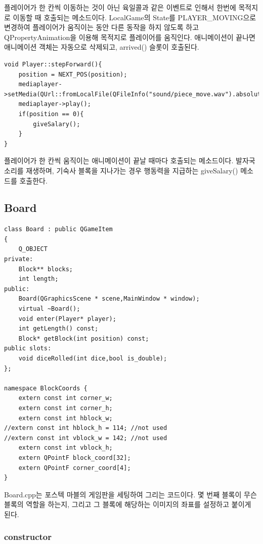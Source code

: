 \documentclass[10pt,oneside,a4paper,titlepage]{article}
\begin{document}
플레이어가 한 칸씩 이동하는 것이 아닌 육일콜과 같은 이벤트로 인해서 한번에 목적지로 이동할 때 호출되는 메소드이다. LocalGame의 State를 PLAYER\_MOVING으로 변경하여 플레이어가 움직이는 동안 다른 동작을 하지 않도록 하고 QPropertyAnimation을 이용해 목적지로 플레이어를 움직인다. 애니메이션이 끝나면 애니메이션 객체는 자동으로 삭제되고, arrived() 슬롯이 호출된다.\\

\begin{lstlisting}
void Player::stepForward(){
    position = NEXT_POS(position);
    mediaplayer->setMedia(QUrl::fromLocalFile(QFileInfo("sound/piece_move.wav").absoluteFilePath()));
    mediaplayer->play();
    if(position == 0){
        giveSalary();
    }
}
\end{lstlisting}
플레이어가 한 칸씩 움직이는 애니메이션이 끝날 때마다 호출되는 메소드이다. 발자국 소리를 재생하며, 기숙사 블록을 지나가는 경우 행동력을 지급하는 giveSalary() 메소드를 호출한다.\\


\subsection{Board}


\begin{lstlisting}
class Board : public QGameItem
{
    Q_OBJECT
private:
    Block** blocks;
    int length;
public:
    Board(QGraphicsScene * scene,MainWindow * window);
    virtual ~Board();
    void enter(Player* player);
    int getLength() const;
    Block* getBlock(int position) const;
public slots:
    void diceRolled(int dice,bool is_double);
};

namespace BlockCoords {
    extern const int corner_w;
    extern const int corner_h;
    extern const int hblock_w;
//extern const int hblock_h = 114; //not used
//extern const int vblock_w = 142; //not used
    extern const int vblock_h;
    extern QPointF block_coord[32];
    extern QPointF corner_coord[4];
}
\end{lstlisting}

Board.cpp는 포스텍 마블의 게임판을 세팅하여 그리는 코드이다. 몇 번째 블록이 무슨 블록의 역할을 하는지, 그리고 그 블록에 해당하는 이미지의 좌표를 설정하고 붙이게 된다.


\subsubsection{constructor}
\end{document}
